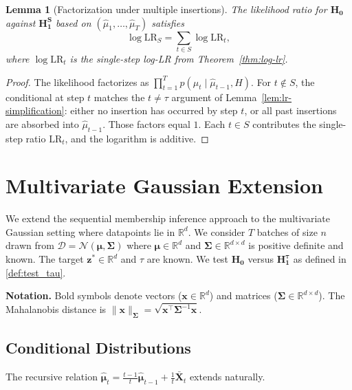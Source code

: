 \documentclass{article}
\theoremstyle{plain}
\newtheorem{lemma}[theorem]{Lemma}
\theoremstyle{definition}
\theoremstyle{remark}
\newcommand{\bs}{\boldsymbol}
\newcommand{\RR}{\ensuremath{\mathbb{R}}}
\newcommand{\cN}{\ensuremath{\mathcal{N}}}
\newcommand{\cD}{\ensuremath{\mathcal{D}}}
\begin{document}
\begin{lemma}[Factorization under multiple insertions]
    \label{lem:multi-insertion}
    The likelihood ratio for $\mathbf{H_0}$ against $\mathbf{H_1^S}$ based on $(\hat\mu_1, \ldots, \hat\mu_T)$ satisfies
    \begin{equation*}
        \log \mathrm{LR}_S = \sum_{t \in S} \log \mathrm{LR}_t,
    \end{equation*}
    where $\log \mathrm{LR}_t$ is the single-step log-LR from Theorem~\ref{thm:log-lr}.
\end{lemma}

\begin{proof}
    The likelihood factorizes as $\prod_{t=1}^{T} p(\hat\mu_t \mid \hat\mu_{t-1}, H)$. For $t \notin S$, the conditional at step $t$ matches the $t \neq \tau$ argument of Lemma~\ref{lem:lr-simplification}: either no insertion has occurred by step $t$, or all past insertions are absorbed into $\hat\mu_{t-1}$. Those factors equal $1$. Each $t \in S$ contributes the single-step ratio $\mathrm{LR}_t$, and the logarithm is additive.
\end{proof}

\section{Multivariate Gaussian Extension}
\label{app:multivariate}

We extend the sequential membership inference approach to the multivariate Gaussian setting where datapoints lie in $\RR^d$. We consider $T$ batches of size $n$ drawn from $\cD = \cN(\bs\mu, \bs\Sigma)$ where $\bs\mu \in \RR^d$ and $\bs\Sigma \in \RR^{d \times d}$ is positive definite and known. The target $\mathbf{z}^* \in \RR^d$ and $\tau$ are known. We test $\mathbf{H_0}$ versus $\mathbf{H_1^\tau}$ as defined in \eqref{def:test_tau}.

\textbf{Notation.} Bold symbols denote vectors ($\mathbf{x} \in \RR^d$) and matrices ($\bs\Sigma \in \RR^{d \times d}$). The Mahalanobis distance is $\|\mathbf{x}\|_{\bs\Sigma} = \sqrt{\mathbf{x}^\top \bs\Sigma^{-1} \mathbf{x}}$.

\subsection{Conditional Distributions}

The recursive relation $\hat{\bs\mu}_t = \frac{t-1}{t}\hat{\bs\mu}_{t-1} + \frac{1}{t}\bar{\mathbf{X}}_t$ extends naturally.
\end{document}

